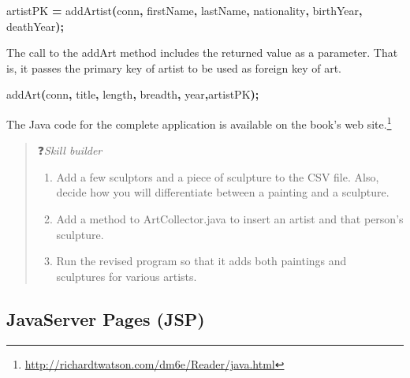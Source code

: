 \documentclass[
]{article}
\newenvironment{Shaded}{\begin{snugshade}}{\end{snugshade}}
\newcommand{\FunctionTok}[1]{\textcolor[rgb]{0.00,0.00,0.00}{#1}}
\newcommand{\NormalTok}[1]{#1}
\newcommand{\OperatorTok}[1]{\textcolor[rgb]{0.81,0.36,0.00}{\textbf{#1}}}
\begin{document}
\begin{Shaded}
\begin{Highlighting}[]
\NormalTok{artistPK }\OperatorTok{=} \FunctionTok{addArtist}\OperatorTok{(}\NormalTok{conn}\OperatorTok{,}\NormalTok{ firstName}\OperatorTok{,}\NormalTok{ lastName}\OperatorTok{,}\NormalTok{ nationality}\OperatorTok{,}\NormalTok{ birthYear}\OperatorTok{,}\NormalTok{ deathYear}\OperatorTok{);}
\end{Highlighting}
\end{Shaded}

The call to the addArt method includes the returned value as a
parameter. That is, it passes the primary key of artist to be used as
foreign key of art.

\begin{Shaded}
\begin{Highlighting}[]
\FunctionTok{addArt}\OperatorTok{(}\NormalTok{conn}\OperatorTok{,}\NormalTok{ title}\OperatorTok{,}\NormalTok{ length}\OperatorTok{,}\NormalTok{ breadth}\OperatorTok{,}\NormalTok{ year}\OperatorTok{,}\NormalTok{artistPK}\OperatorTok{);}
\end{Highlighting}
\end{Shaded}

The Java code for the complete application is available on the book's
web site.\footnote{\url{http://richardtwatson.com/dm6e/Reader/java.html}}

\begin{quote}
❓\emph{Skill builder}

\begin{enumerate}
\def\labelenumi{\arabic{enumi}.}
\item
  Add a few sculptors and a piece of sculpture to the CSV file.
  Also, decide how you will differentiate between a painting and a
  sculpture.
\item
  Add a method to ArtCollector.java to insert an artist and that
  person's sculpture.
\item
  Run the revised program so that it adds both paintings and\\
  sculptures for various artists.
\end{enumerate}
\end{quote}

\hypertarget{javaserver-pages-jsp}{%
\subsection*{JavaServer Pages (JSP)}\label{javaserver-pages-jsp}}
\end{document}
